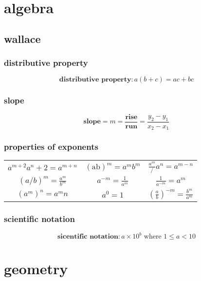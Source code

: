 \documentclass[a4paper,12pt]{article}
\author{m7tkr}
\begin{document}
\tableofcontents

\section{algebra}

\subsection{wallace}

\subsubsection{distributive property}

\[
\textbf{distributive property}: a(b+c)=ac+bc
\]

\subsubsection{slope}

\[
\textbf{slope}=\mathit{m}=\frac{\textbf{rise}}{\textbf{run}}=\frac{y_2-y_1}{x_2-x_1}
\]
\subsubsection{properties of exponents}

\begin{tabular}{ccc}
\( a^{m+2}a^n+2=a^{m+n} \) & \( (\mathrm{ab})^m=a^{m}b^{m} \) & \( \frac{a^m}/{a^n}=a^{m-n} \) \\
\( \left(a/b\right)^m=\frac{a^m}{b^m} \) & \( a^{-m}=\frac{1}{a^m} \) & \( \frac{1}{a^{-m}}=a^m \) \\
\( (a^m)^n=a^mn \) & \( a^0=1 \) & \(\left(\frac{a}{b}\right)^{-m}=\frac{b^m}{a^m} \)
\end{tabular}

\subsubsection{scientific notation}

\[
\textbf{sicentific notation}: a \times 10^b \textrm{ where }1 \leqslant a < 10
\]

\section{geometry}
\end{document}
